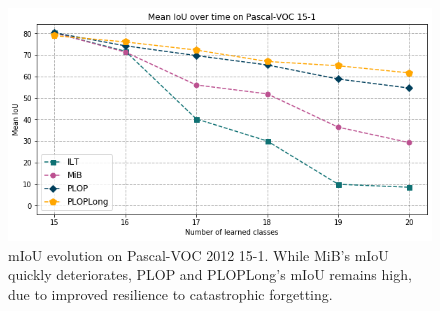 \begin{figure}
    \centering
    \includegraphics[width=\linewidth]{images/seg/voc_15-1.png}
    \vspace*{-0.3cm}
    \caption{\ac{mIoU} evolution on Pascal-VOC 2012 15-1. While MiB's \ac{mIoU} quickly
        deteriorates, PLOP and PLOPLong's \ac{mIoU} remains high, due to improved resilience to
        catastrophic forgetting.}
    \label{fig:seg_plot_voc_15-1}
\end{figure}




